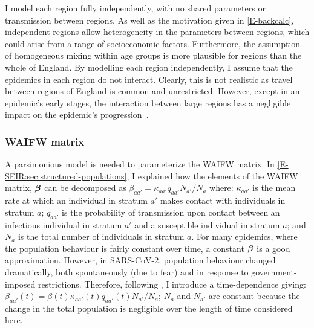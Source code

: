 \documentclass[thesis.tex]{subfiles}
\begin{document}

I model each region fully independently, \ie with no shared parameters or transmission between regions.
As well as the motivation given in \cref{E-backcalc}, independent regions allow heterogeneity in the parameters between regions, which could arise from a range of socioeconomic factors.
Furthermore, the assumption of homogeneous mixing within age groups is more plausible for regions than the whole of England.
By modelling each region independently, I assume that the epidemics in each region do not interact.
Clearly, this is not realistic as travel between regions of England is common and unrestricted.
However, except in an epidemic's early stages, the interaction between large regions has a negligible impact on the epidemic's progression~\autocite[e.g.][]{birrellRealtimea,gogSpatial,eggoSpatial}.

\subsubsection{WAIFW matrix} \label{SEIR:sec:WAIFW-application}

A parsimonious model is needed to parameterize the WAIFW matrix.
In \cref{E-SEIR:sec:structured-populations}, I explained how the elements of the WAIFW matrix, $\bm{\beta}$ can be decomposed as $\beta_{aa'} = \kappa_{aa'} q_{aa'} N_{a'} / N_{a}$ where: $\kappa_{aa'}$ is the mean rate at which an individual in stratum $a'$ makes contact with individuals in stratum $a$; $q_{aa'}$ is the probability of transmission upon contact between an infectious individual in stratum $a'$ and a susceptible individual in stratum $a$; and $N_{a}$ is the total number of individuals in stratum $a$.
For many epidemics, where the population behaviour is fairly constant over time, a constant $\bm{\beta}$ is a good approximation.
However, in SARS-CoV-2, population behaviour changed dramatically, both spontaneously (\eg due to fear) and in response to government-imposed restrictions.
Therefore, following \textcite{birrellRealtime}, I introduce a time-dependence giving: $\beta_{aa'}(t) = \beta(t) \kappa_{aa'}(t) q_{aa'}(t) N_{a'} / N_a$; $N_a$ and $N_{a'}$ are constant because the change in the total population is negligible over the length of time considered here.
\end{document}
